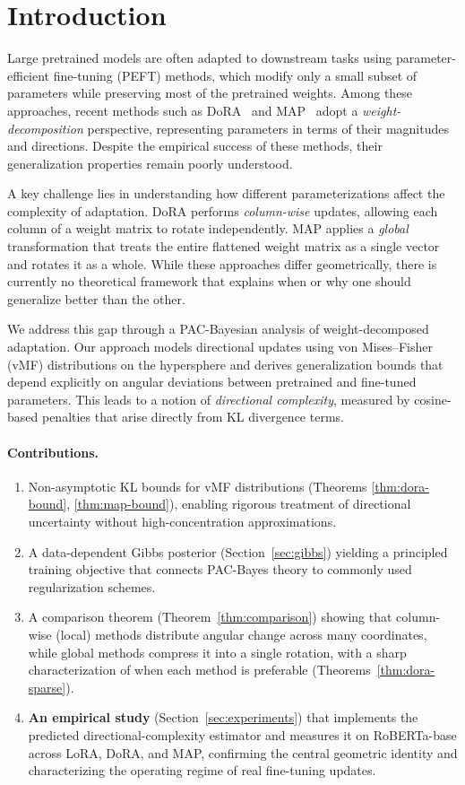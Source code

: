 \documentclass[11pt]{article}
\begin{document}
\section{Introduction}

Large pretrained models are often adapted to downstream tasks using
parameter-efficient fine-tuning (PEFT) methods, which modify only a small subset of
parameters while preserving most of the pretrained weights. Among these approaches,
recent methods such as DoRA~\cite{dora} and MAP~\cite{map} adopt a
\emph{weight-decomposition} perspective, representing parameters in terms of their
magnitudes and directions. Despite the empirical success of these methods, their
generalization properties remain poorly understood.

A key challenge lies in understanding how different parameterizations affect the
complexity of adaptation. DoRA performs \emph{column-wise} updates, allowing each
column of a weight matrix to rotate independently. MAP applies a \emph{global}
transformation that treats the entire flattened weight matrix as a single vector and
rotates it as a whole. While these approaches differ geometrically, there is
currently no theoretical framework that explains when or why one should generalize
better than the other.

We address this gap through a PAC-Bayesian analysis of weight-decomposed adaptation.
Our approach models directional updates using von Mises--Fisher (vMF) distributions
on the hypersphere and derives generalization bounds that depend explicitly on
angular deviations between pretrained and fine-tuned parameters. This leads to a
notion of \emph{directional complexity}, measured by cosine-based penalties that
arise directly from KL divergence terms.

\paragraph{Contributions.}
\begin{enumerate}[leftmargin=*,itemsep=1pt]
\item Non-asymptotic KL bounds for vMF distributions (Theorems
\ref{thm:dora-bound}, \ref{thm:map-bound}), enabling rigorous treatment of
directional uncertainty without high-concentration approximations.
\item A data-dependent Gibbs posterior (Section~\ref{sec:gibbs}) yielding a
principled training objective that connects PAC-Bayes theory to commonly used
regularization schemes.
\item A comparison theorem (Theorem~\ref{thm:comparison}) showing that column-wise
(local) methods distribute angular change across many coordinates, while global
methods compress it into a single rotation, with a sharp characterization of when
each method is preferable (Theorems~\ref{thm:dora-sparse}).
\item \textbf{An empirical study} (Section~\ref{sec:experiments}) that implements the
predicted directional-complexity estimator and measures it on RoBERTa-base across
LoRA, DoRA, and MAP, confirming the central geometric identity and characterizing
the operating regime of real fine-tuning updates.
\end{enumerate}
\end{document}
